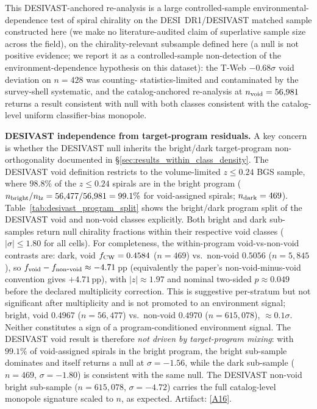 \documentclass[aps,prd,twocolumn,superscriptaddress,showpacs,preprintnumbers,nofootinbib,longbibliography,floatfix]{revtex4-2}
\newcommand{\repoBase}{https://github.com/Hubify-Projects/bigbounce/blob/main}
\begin{document}
This DESIVAST-anchored re-analysis is a large controlled-sample
environmental-dependence test of spiral chirality on the DESI~DR1/DESIVAST
matched sample constructed here (we make no literature-audited
claim of superlative sample size across the field),
on the chirality-relevant subsample defined here
(a null is not positive evidence; we report it as a controlled-sample
non-detection of the environment-dependence hypothesis on this dataset):
the T-Web $-0.68\sigma$ void deviation on $n = 428$ was counting-
statistics-limited and contaminated by the survey-shell systematic,
and the catalog-anchored re-analysis at $n_{\rm void} = 56{,}981$
returns a result consistent with null with both classes consistent with the catalog-
level uniform classifier-bias monopole.

\textbf{DESIVAST independence from target-program residuals.}
A key concern is whether the DESIVAST null inherits the bright/dark
target-program non-orthogonality documented in
\S\ref{sec:results_within_class_density}. The DESIVAST void definition
restricts to the volume-limited $z \leq 0.24$ BGS sample, where
$98.8\%$ of the $z \leq 0.24$ spirals are in the bright program
($n_{\rm bright}/n_{\rm lz} = 56{,}477/56{,}981 = 99.1\%$ for
void-assigned spirals; $n_{\rm dark} = 469$).
Table~\ref{tab:desivast_program_split} shows the bright/dark
program split of the DESIVAST void and non-void classes explicitly.
Both bright and dark sub-samples return null
chirality fractions within their respective void classes
($|\sigma| \leq 1.80$ for all cells). For completeness, the
within-program void-vs-non-void contrasts are: dark, void
$f_{\rm CW}=0.4584$ ($n=469$) vs.\ non-void $0.5056$ ($n=5{,}845$), so
$f_{\rm void}-f_{\rm non\mbox{-}void}\approx-4.71$\,pp (equivalently the
paper's non-void-minus-void convention gives $+4.71$\,pp), with
$|z|\approx1.97$ and nominal two-sided $p\approx0.049$ before the declared
multiplicity correction. This is suggestive per-stratum but not significant
after multiplicity and is not promoted to an environment signal; bright, void
$0.4967$ ($n=56{,}477$) vs.\ non-void $0.4970$ ($n=615{,}078$),
${\approx}0.1\sigma$. Neither constitutes a sign of a
program-conditioned environment signal. The DESIVAST void result
is therefore \emph{not driven by target-program mixing}: with
$99.1\%$ of void-assigned spirals in the bright program, the bright
sub-sample dominates and itself returns a null at $\sigma = -1.56$,
while the dark sub-sample ($n = 469$, $\sigma = -1.80$) is consistent
with the same null. The DESIVAST non-void bright sub-sample
($n = 615{,}078$, $\sigma = -4.72$) carries the full catalog-level
monopole signature scaled to $n$, as expected.
Artifact:
\href{\repoBase/pipelines/p5\_desi\_chirality/outputs/28\_ext1\_desivast\_program\_split.json}{[A16]}.
\end{document}
